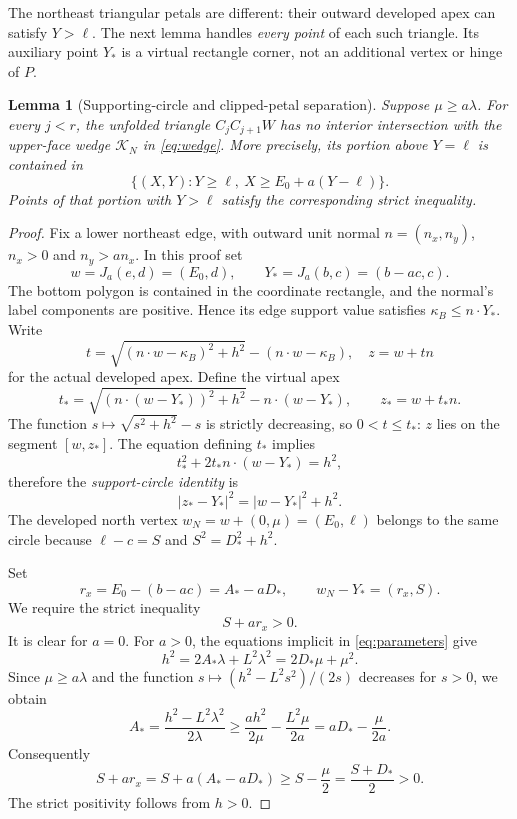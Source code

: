\documentclass[a4paper,11pt]{amsart}
\newtheorem{lemma}[theorem]{Lemma}
\begin{document}
The northeast triangular petals are different: their outward developed apex can satisfy $Y>\ell$. The next lemma handles \emph{every point} of each such triangle. Its auxiliary point $Y_*$ is a virtual rectangle corner, not an additional vertex or hinge of $P$.

\begin{lemma}[Supporting-circle and clipped-petal separation]\label{lem:remote}
Suppose $\mu\geq a\lambda$. For every $j<r$, the unfolded triangle $C_jC_{j+1}W$ has no interior intersection with the upper-face wedge $\mathcal K_N$ in \eqref{eq:wedge}. More precisely, its portion above $Y=\ell$ is contained in
\[
 \{(X,Y):Y\geq\ell,\ X\geq E_0+a(Y-\ell)\}.
\]
Points of that portion with $Y>\ell$ satisfy the corresponding strict inequality.
\end{lemma}
\begin{proof}
Fix a lower northeast edge, with outward unit normal $n=(n_x,n_y)$, $n_x>0$ and $n_y>a n_x$. In this proof set
\[
 w=J_a(e,d)=(E_0,d),\qquad Y_*=J_a(b,c)=(b-ac,c).
\]
The bottom polygon is contained in the coordinate rectangle, and the normal's label components are positive. Hence its edge support value satisfies $\kappa_B\leq n\cdot Y_*$. Write
\[
 t=\sqrt{(n\cdot w-\kappa_B)^2+h^2}-(n\cdot w-\kappa_B),
\quad z=w+tn
\]
for the actual developed apex. Define the virtual apex
\[
 t_*=\sqrt{(n\cdot(w-Y_*))^2+h^2}-n\cdot(w-Y_*),
 \qquad z_*=w+t_*n.
\]
The function $s\mapsto\sqrt{s^2+h^2}-s$ is strictly decreasing, so $0<t\leq t_*$: $z$ lies on the segment $[w,z_*]$. The equation defining $t_*$ implies
\[
 t_*^2+2t_*n\cdot(w-Y_*)=h^2,
\]
therefore the \emph{support-circle identity} is
\begin{equation}\label{eq:circle}
 |z_*-Y_*|^2=|w-Y_*|^2+h^2.
\end{equation}
The developed north vertex $w_N=w+(0,\mu)=(E_0,\ell)$ belongs to the same circle because $\ell-c=S$ and $S^2=D_*^2+h^2$.

Set
\begin{equation}\label{eq:rx}
 r_x=E_0-(b-ac)=A_*-aD_*,\qquad
 w_N-Y_*=(r_x,S).
\end{equation}
We require the strict inequality
\begin{equation}\label{eq:keypositive}
 S+a r_x>0.
\end{equation}
It is clear for $a=0$. For $a>0$, the equations implicit in \eqref{eq:parameters} give
\begin{equation}\label{eq:parameteridentities}
 h^2=2A_*\lambda+L^2\lambda^2
     =2D_*\mu+\mu^2.
\end{equation}
Since $\mu\geq a\lambda$ and the function
$s\mapsto(h^2-L^2s^2)/(2s)$ decreases for $s>0$, we obtain
\[
 A_*=\frac{h^2-L^2\lambda^2}{2\lambda}
 \geq\frac{a h^2}{2\mu}-\frac{L^2\mu}{2a}
 =aD_*-\frac{\mu}{2a}.
\]
Consequently
\begin{equation}\label{eq:keylower}
 S+a r_x=S+a(A_*-aD_*)
 \geq S-\frac\mu2=\frac{S+D_*}{2}>0.
\end{equation}
The strict positivity follows from $h>0$.


\end{proof}
\end{document}
